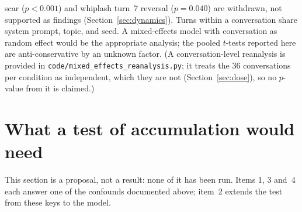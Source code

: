 \documentclass[11pt,a4paper]{article}
\begin{document}
\begin{enumerate}[nosep]
          scar ($p{<}0.001$) and whiplash turn~7 reversal ($p{=}0.040$)
          are withdrawn, not supported as findings (Section~\ref{sec:dynamics}).
          Turns within a
          conversation share system prompt, topic, and seed. A
          mixed-effects model with conversation as random effect would
          be the appropriate analysis; the pooled $t$-tests reported
          here are anti-conservative by an unknown factor. (A
          conversation-level reanalysis is provided in
          \texttt{code/\allowbreak mixed\_\allowbreak effects\_\allowbreak reanalysis.py}; it treats the 36
          conversations per condition as independent, which they are not
          (Section~\ref{sec:dose}), so no $p$-value from it is claimed.)
\end{enumerate}

\section{What a test of accumulation would need}
\label{sec:test}

This section is a proposal, not a result: none of it has been run.
Items 1, 3 and~4 each answer one of the confounds documented above;
item~2 extends the test from these keys to the model.
\end{document}
